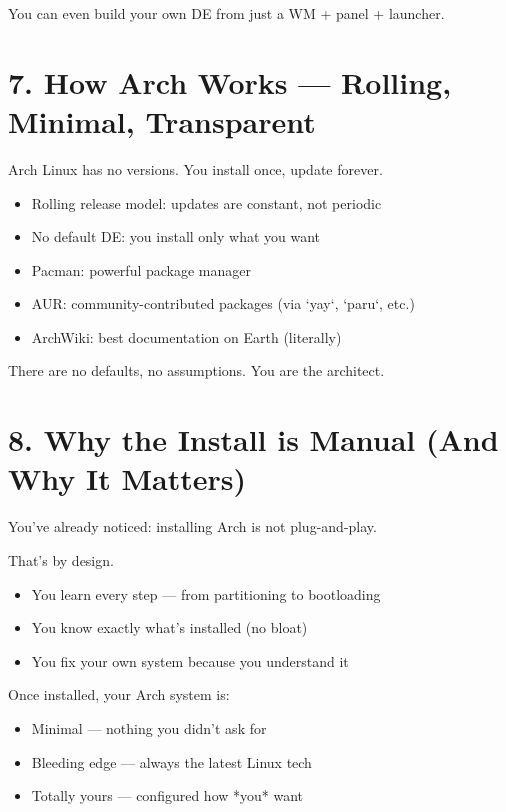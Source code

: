 \documentclass[12pt,openany]{book}
\begin{document}
You can even build your own DE from just a WM + panel + launcher.

\section{7. How Arch Works — Rolling, Minimal, Transparent}

Arch Linux has no versions. You install once, update forever.

\begin{itemize}
  \item Rolling release model: updates are constant, not periodic
  \item No default DE: you install only what you want
  \item Pacman: powerful package manager
  \item AUR: community-contributed packages (via `yay`, `paru`, etc.)
  \item ArchWiki: best documentation on Earth (literally)
\end{itemize}

There are no defaults, no assumptions. You are the architect.

\section{8. Why the Install is Manual (And Why It Matters)}

You’ve already noticed: installing Arch is not plug-and-play.

That’s by design.

\begin{itemize}
  \item You learn every step — from partitioning to bootloading
  \item You know exactly what’s installed (no bloat)
  \item You fix your own system because you understand it
\end{itemize}

Once installed, your Arch system is:
\begin{itemize}
  \item Minimal — nothing you didn’t ask for
  \item Bleeding edge — always the latest Linux tech
  \item Totally yours — configured how *you* want
\end{itemize}

\clearpage
\end{document}
